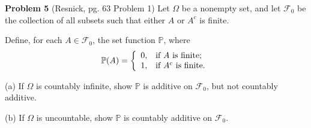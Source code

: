 \documentclass{article}
\begin{document}
\vspace{3 mm}



\noindent \textbf{Problem 5} (Resnick, pg. 63 Problem 1) Let $\Omega$ be a nonempty set, and let $\mathcal{F}_{0}$ be the collection of all subsets such that either $A$ or $A^{c}$ is finite.

\vspace{2 mm}

\noindent Define, for each $A \in \mathcal{F}_{0}$, the set function $\mathbb{P}$, where
\begin{eqnarray*} \mathbb{P}(A) = \left\{
                                    \begin{array}{ll}
                                      0, & \hbox{if $A$ is finite;} \\
                                      1, & \hbox{if $A^{c}$ is finite.}
                                    \end{array}
                                  \right. \end{eqnarray*}

\vspace{2 mm}

\noindent (a) If $\Omega$ is countably infinite, show $\mathbb{P}$ is additive on $\mathcal{F}_{0}$, but not countably additive.

\vspace{2 mm}

\noindent (b) If $\Omega$ is uncountable, show $\mathbb{P}$ is countably additive on $\mathcal{F}_{0}$.
\end{document}

